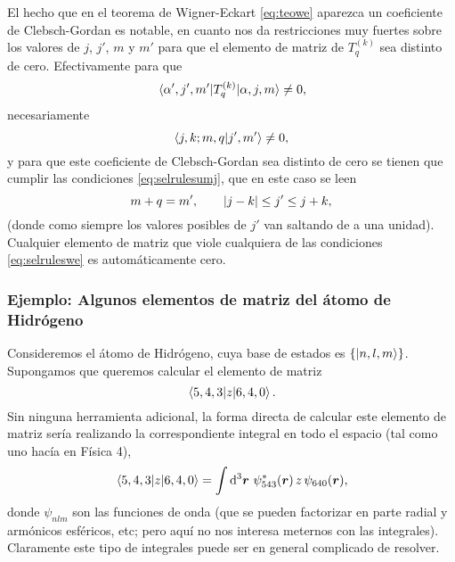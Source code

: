 \documentclass[10pt, a4paper]{article}
\numberwithin{equation}{subsection}
\begin{document}
El hecho que en el teorema de Wigner-Eckart \eqref{eq:teowe} aparezca un
coeficiente de Clebsch-Gordan es notable, en cuanto nos da restricciones muy
fuertes sobre los valores de $j$, $j'$, $m$ y $m'$ para que el elemento de
matriz de $T^{(k)}_q$ sea distinto de cero. Efectivamente para que
\begin{equation}
  \matrixel{\alpha',j',m'}{T^{(k)}_{q}}{\alpha,j,m} \neq 0,
\end{equation}
necesariamente
\begin{equation}
  \braket{{j},{k};{m},{q}}{{j'},{m'}} \neq 0,
\end{equation}
y para que este coeficiente de Clebsch-Gordan sea distinto de cero se tienen
que cumplir las condiciones \eqref{eq:selrulesumj}, que en este caso se leen
\begin{equation} \label{eq:selruleswe}
  m + q = m', \qquad \abs{j-k} \leq j' \leq j + k,
\end{equation}
(donde como siempre los valores posibles de $j'$ van saltando de a una unidad).
Cualquier elemento de matriz que viole cualquiera de las condiciones
\eqref{eq:selruleswe} es automáticamente cero.

\subsubsection{Ejemplo: Algunos elementos de matriz del átomo de Hidrógeno}

Consideremos el átomo de Hidrógeno, cuya base de estados es
$\set{\ket{n,l,m}}$. Supongamos que queremos calcular el elemento de matriz
\begin{equation}
  \matrixel{5,4,3}{z}{6,4,0}.
\end{equation}
Sin ninguna herramienta adicional, la forma directa de calcular este elemento
de matriz sería realizando la correspondiente integral en todo el espacio (tal
como uno hacía en Física 4),
\begin{equation}
  \matrixel{5,4,3}{z}{6,4,0} =
  \int\dd[3]{\vect{r}}\,\psi^*_{543}(\vect{r})\,z\,\psi_{640}(\vect{r}),
\end{equation}
donde $\psi_{nlm}$ son las funciones de onda (que se pueden factorizar en parte
radial y armónicos esféricos, etc; pero aquí no nos interesa meternos con las
integrales). Claramente este tipo de integrales puede ser en general complicado
de resolver.
\end{document}
